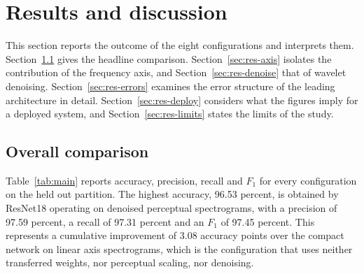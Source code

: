 \section{Results and discussion}\label{sec:results}

This section reports the outcome of the eight configurations and interprets
them. Section~\ref{sec:res-overall} gives the headline comparison.
Section~\ref{sec:res-axis} isolates the contribution of the frequency axis,
and Section~\ref{sec:res-denoise} that of wavelet denoising.
Section~\ref{sec:res-errors} examines the error structure of the leading
architecture in detail. Section~\ref{sec:res-deploy} considers what the
figures imply for a deployed system, and Section~\ref{sec:res-limits} states
the limits of the study.

\subsection{Overall comparison}\label{sec:res-overall}

Table~\ref{tab:main} reports accuracy, precision, recall and $F_1$ for every
configuration on the held out partition. The highest accuracy, 96.53 percent,
is obtained by ResNet18 operating on denoised perceptual spectrograms, with a
precision of 97.59 percent, a recall of 97.31 percent and an $F_1$ of 97.45
percent. This represents a cumulative improvement of 3.08 accuracy points over
the compact network on linear axis spectrograms, which is the configuration
that uses neither transferred weights, nor perceptual scaling, nor denoising.

